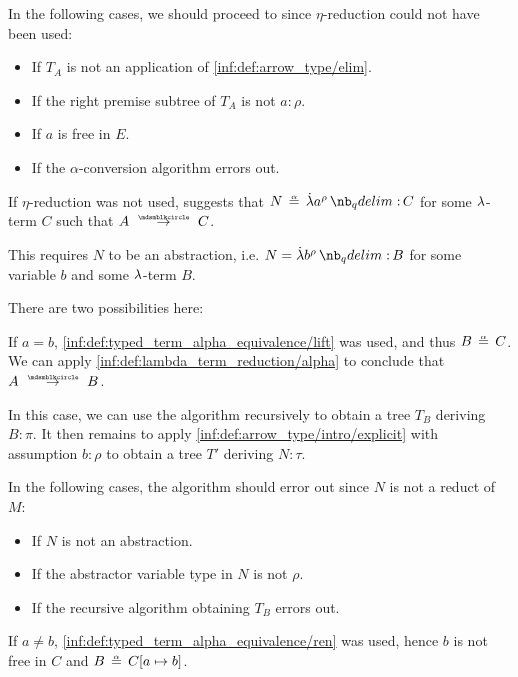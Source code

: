 \begin{algorithm}
\begin{thmenum}
\begin{thmenum}
      In the following cases, we should proceed to  since \( \eta \)-reduction could not have been used:
      \begin{itemize}
        \item If \( T_A \) is not an application of \ref{inf:def:arrow_type/elim}.
        \item If the right premise subtree of \( T_A \) is not \( a: \rho \).
        \item If \( a \) is free in \( E \).
        \item If the \( \alpha \)-conversion algorithm errors out.
      \end{itemize}

       If \( \eta \)-reduction was not used,  suggests that \( N \aequiv \qabs {a^\rho} C \) for some \( {\mathrm \lambda} \)-term \( C \) such that \( A \pred C \).

      This requires \( N \) to be an abstraction, i.e. \( N = \qabs {b^\rho} B \) for some variable \( b \) and some \( {\mathrm \lambda} \)-term \( B \).

      There are two possibilities here:
      \begin{thmenum}
         If \( a = b \), \ref{inf:def:typed_term_alpha_equivalence/lift} was used, and thus \( B \aequiv C \). We can apply \ref{inf:def:lambda_term_reduction/alpha} to conclude that \( A \pred B \).

        In this case, we can use the algorithm recursively to obtain a tree \( T_B \) deriving \( B: \pi \). It then remains to apply \ref{inf:def:arrow_type/intro/explicit} with assumption \( b: \rho \) to obtain a tree \( T' \) deriving \( N: \tau \).

        In the following cases, the algorithm should error out since \( N \) is not a reduct of \( M \):
        \begin{itemize}
          \item If \( N \) is not an abstraction.
          \item If the abstractor variable type in \( N \) is not \( \rho \).
          \item If the recursive algorithm obtaining \( T_B \) errors out.
        \end{itemize}

         If \( a \neq b \), \ref{inf:def:typed_term_alpha_equivalence/ren} was used, hence \( b \) is not free in \( C \) and \( B \aequiv C[a \mapsto b] \).


\end{thmenum}
\end{thmenum}
\end{thmenum}
\end{algorithm}
